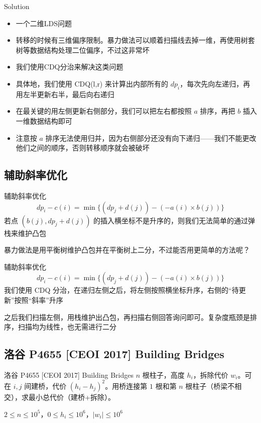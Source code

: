 ﻿\documentclass[aspectratio=169]{ctexbeamer}
\begin{document}
\begin{frame}{Solution}
    \begin{itemize}
        \item 一个二维LDS问题
        \item 转移的时候有三维偏序限制。暴力做法可以顺着扫描线去掉一维，再使用树套树等数据结构处理二位偏序，不过这非常坏
        \item 我们使用CDQ分治来解决这类问题
        \item 具体地，我们使用 CDQ(l,r) 来计算出内部所有的 $dp_i$，每次先向左递归，再用左半更新右半，最后向右递归
        \item 在最关键的用左侧更新右侧部分，我们可以把左右都按照 $a$ 排序，再把 $b$ 插入一维数据结构即可
        \item 注意按 $a$ 排序无法使用归并，因为右侧部分还没有向下递归——我们不能更改他们之间的顺序，否则转移顺序就会被破坏
    \end{itemize}
\end{frame}

\subsection{辅助斜率优化}
\begin{frame}{辅助斜率优化}
    $$
        dp_i-c(i)=\min\{(dp_j+d(j))-(-a(i)\times b(j))\}
    $$
    若点 $(b(j),dp_j+d(j))$ 的插入横坐标不是升序的，则我们无法简单的通过弹栈来维护凸包

    暴力做法是用平衡树维护凸包并在平衡树上二分，不过能否用更简单的方法呢？

\end{frame}
\begin{frame}{辅助斜率优化}
    $$
        dp_i-c(i)=\min\{(dp_j+d(j))-(-a(i)\times b(j))\}
    $$
    我们使用 CDQ 分治，在递归左侧之后，将左侧按照横坐标升序，右侧的“待更新”按照“斜率”升序

    之后我们扫描左侧，用栈维护出凸包，再扫描右侧回答询问即可。复杂度瓶颈是排序，扫描均为线性，也无需进行二分

\end{frame}

\subsection{洛谷 P4655 [CEOI 2017] Building Bridges}

\begin{frame}{洛谷 P4655 [CEOI 2017] Building Bridges}
      $n$ 根柱子，高度 $h_i$，拆除代价 $w_i$。可在 $i,j$ 间建桥，代价 $(h_i-h_j)^2$。用桥连接第 $1$ 根和第 $n$ 根柱子（桥梁不相交），求最小总代价（建桥+拆除）。
      
      $2\le n\le 10^5$，$0\le h_i\le 10^6$，$|w_i|\le 10^6$
\end{frame}
\end{document}
